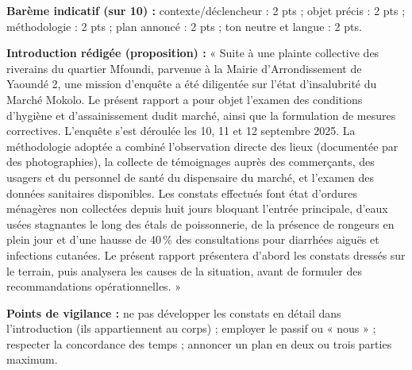 \documentclass[11pt]{article}
\begin{document}
\begin{corrige}
\textbf{Barème indicatif (sur 10) :} contexte/déclencheur : 2 pts ; objet précis : 2 pts ; méthodologie : 2 pts ; plan annoncé : 2 pts ; ton neutre et langue : 2 pts.

\textbf{Introduction rédigée (proposition) :}
« Suite à une plainte collective des riverains du quartier Mfoundi, parvenue à la Mairie d'Arrondissement de Yaoundé 2, une mission d'enquête a été diligentée sur l'état d'insalubrité du Marché Mokolo. Le présent rapport a pour objet l'examen des conditions d'hygiène et d'assainissement dudit marché, ainsi que la formulation de mesures correctives. L'enquête s'est déroulée les 10, 11 et 12 septembre 2025. La méthodologie adoptée a combiné l'observation directe des lieux (documentée par des photographies), la collecte de témoignages auprès des commerçants, des usagers et du personnel de santé du dispensaire du marché, et l'examen des données sanitaires disponibles. Les constats effectués font état d'ordures ménagères non collectées depuis huit jours bloquant l'entrée principale, d'eaux usées stagnantes le long des étals de poissonnerie, de la présence de rongeurs en plein jour et d'une hausse de 40\,\% des consultations pour diarrhées aiguës et infections cutanées. Le présent rapport présentera d'abord les constats dressés sur le terrain, puis analysera les causes de la situation, avant de formuler des recommandations opérationnelles. »

\textbf{Points de vigilance :} ne pas développer les constats en détail dans l'introduction (ils appartiennent au corps) ; employer le passif ou « nous » ; respecter la concordance des temps ; annoncer un plan en deux ou trois parties maximum.
\end{corrige}
\end{document}
